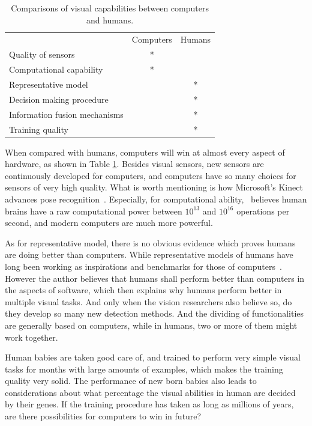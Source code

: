 \begin{table}[h]
\centering
\begin{tabular}{lcc}
     \hline
     \hline
                               &	Computers & Humans \\
    Quality of sensors         &	* &   \\
    Computational capability      &	* &	  \\
    Representative model       &	  & * \\
    Decision making procedure         &      & *	  \\
    Information fusion mechanisms & & *           \\
    Training quality           &      & *	   \\
   \hline
\end{tabular}
\caption[Comparisons in visual capabilities between computers and humans]{Comparisons of visual capabilities between computers and humans.}\label{c2tb:tb1}
\end{table}

When compared with humans, computers will win at almost every aspect of hardware, as shown in Table \ref{c2tb:tb1}. Besides visual sensors, new sensors are continuously developed for computers, and computers have so many choices for sensors of very high quality. What is worth mentioning is how Microsoft's Kinect advances pose recognition~\citep{knct}. Especially, for computational ability,~\citep{bpw} believes human brains have a raw computational power between $10^{13}$ and $10^{16}$ operations per second, and modern computers are much more powerful.

 As for representative model, there is no obvious evidence which proves humans are doing better than computers. While representative models of humans have long been working as inspirations and benchmarks for those of computers~\citep{rbm}. However the author believes that humans shall perform better than computers in the aspects of software, which then explains why humans perform better in multiple visual tasks. And only when the vision researchers also believe so, do they develop  so many new detection methods. And the  dividing of functionalities  are generally based on computers, while in humans, two or more of them might work together.

Human babies are taken good care of, and trained to perform very simple visual tasks for months with large amounts of examples, which makes the training quality very solid. The performance of new born babies also leads to considerations about what percentage the visual abilities in human are decided by their genes. If the training procedure has taken as long as millions of years, are there possibilities for computers to win in future?

